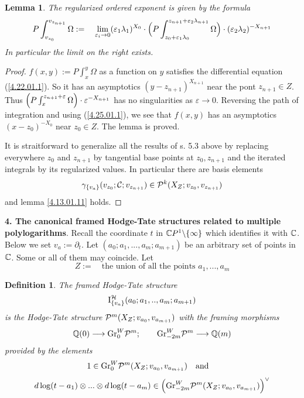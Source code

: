 \documentclass[10pt]{article}
\newtheorem{lemma}[theorem]{Lemma}
\newtheorem{definition}[theorem]{Definition}
\begin{document}
\begin{lemma} \label{4.22.01.1lem}
The regularized ordered exponent is given by the formula 
$$
P\int_{v_{z_0}}^{v_{z_{n+1}}}\Omega:= \quad \lim_{\varepsilon_i \to 0} 
(\varepsilon_1 \lambda_1)^{X_{0}}\cdot
\Bigl(P\int_{z_0+ \varepsilon_1 \lambda_{0}}^{z_{n+1} 
+ \varepsilon_2 \lambda_{n+1}} 
\Omega\Bigr)\cdot 
(\varepsilon_2 \lambda_2)^{-X_{{n+1}}}
$$
In particular the limit on  the right exists.  
\end{lemma}

\begin{proof}  $f(x,y):= P\int_{x}^{y} \Omega$ as a function on $y$ satisfies 
the differential equation (\ref{4.22.01.1}). So it 
has an asymptotics $(y-z_{n+1})^{X_{n+1}}$ 
near the pont $z_{n+1} \in Z$. Thus $\Bigl(P\int_{x}^{z_{n+1} 
+ \varepsilon} 
\Omega\Bigr)\cdot 
\varepsilon^{-X_{{n+1}}}$ has no singularities as 
$\varepsilon \to 0$. Reversing the path of integration and using (\ref{4.25.01.1}), 
we see that 
 $f(x,y)$ 
has an asymptotics $(x-z_{0})^{-X_{0}}$ near $z_{0} \in Z$. The lemma is proved.

It is straitforward to  generalize all the results of s. 5.3 above by replacing
 everywhere $z_0$ and $z_{n+1}$ by tangential base points 
at $z_0, z_{n+1}$ and the iterated integrals by its regularized values. 
In particular there are basis elements
$$
\gamma_{\{v_a\}}(v_{z_0}; {\cal C}; v_{z_{n+1}}) \in 
{\cal P}^k(X_Z; v_{z_0}, v_{z_{n+1}})
$$
and lemma \ref{4.13.01.11} holds. 


\end{proof}

{\bf 4. The canonical framed Hodge-Tate  structures related to 
multiple polylogarithms}. Recall the coordinate $t$ 
in ${\mathbb C} P^1 \backslash \{\infty\}$ which identifies it with ${\mathbb C}$. 
Below we set  $v_a:= \partial_t$. 
Let $(a_0; a_1, ..., a_m; a_{m+1})$ be an arbitrary set of 
points in ${\mathbb C}$. Some or all of them may coincide. Let
$$
Z:= \quad \mbox{the union of 
all the points $a_1, ..., a_m$}
$$
\begin{definition} \label{4.12.01.20}
The framed Hodge-Tate structure 
\begin{equation} \label{4.13.01.111}
{\rm I}^{\cal H}_{\{v_a\}}(a_0; a_1, .., a_m; a_{m+1})
 \end{equation}
is the Hodge-Tate structure 
${\cal P}^m(X_Z; v_{a_0}, v_{a_{m+1}})$ with the framing morphisms $$
{\mathbb Q}(0) \longrightarrow {\rm Gr}^W_0{\cal P}^m; \qquad 
{\rm Gr}^W_{-2m}{\cal P}^m \longrightarrow {\mathbb Q}(m)$$ provided by the  elements
\begin{equation} \label{3.5.01.4}
1 \in {\rm Gr}^W_0{\cal P}^m(X_Z; v_{a_0}, v_{a_{m+1}})
\quad \mbox{and} \quad 
\end{equation}
\begin{equation} \label{3.5.01.5} 
d\log(t-a_1) \otimes ... \otimes d\log(t-a_m) \in \Bigl({\rm Gr}^W_{-2m}{\cal P}^m(X_Z; v_{a_0}, v_{a_{m+1}})\Bigr)^{\vee}
\end{equation}
 
\end{definition}
\end{document}
